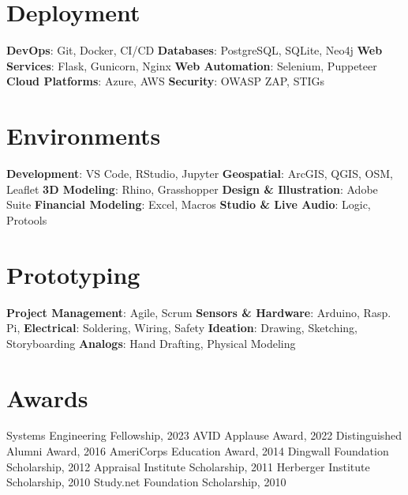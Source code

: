 \documentclass{article}
\begin{document}
\begin{bgbox}[
        height = \paperheight,
        width = 0.3\textwidth,
        colback = gray
    ]
{            \section*{Deployment}
                \textbf{DevOps}: Git, Docker, CI/CD \newline
                \textbf{Databases}: PostgreSQL, SQLite, Neo4j\newline
                \textbf{Web Services}: Flask, Gunicorn, Nginx\newline
                \textbf{Web Automation}: Selenium, Puppeteer\newline
                \textbf{Cloud Platforms}: Azure, AWS\newline
                \textbf{Security}: OWASP ZAP, STIGs
            \section*{Environments}
                \textbf{Development}: VS Code, RStudio, Jupyter\newline
                \textbf{Geospatial}: ArcGIS, QGIS, OSM, Leaflet\newline
                \textbf{3D Modeling}: Rhino, Grasshopper\newline
                \textbf{Design \& Illustration}: Adobe Suite\newline
                \textbf{Financial Modeling}: Excel, Macros\newline
                \textbf{Studio \& Live Audio}: Logic, Protools
            \section*{Prototyping}
                \textbf{Project Management}: Agile, Scrum\newline
                \textbf{Sensors \& Hardware}: Arduino, Rasp. Pi,\newline
                \textbf{Electrical}: Soldering, Wiring, Safety\newline
                \textbf{Ideation}: Drawing, Sketching, Storyboarding\newline
                \textbf{Analogs}: Hand Drafting, Physical Modeling
            \section*{Awards}
                Systems Engineering Fellowship, 2023\newline
                AVID Applause Award, 2022\newline
                Distinguished Alumni Award, 2016\newline
                AmeriCorps Education Award, 2014\newline
                Dingwall Foundation Scholarship, 2012\newline
                Appraisal Institute Scholarship, 2011\newline
                Herberger Institute Scholarship, 2010\newline
                Study.net Foundation Scholarship, 2010 
        }
    \end{bgbox}
\end{document}
